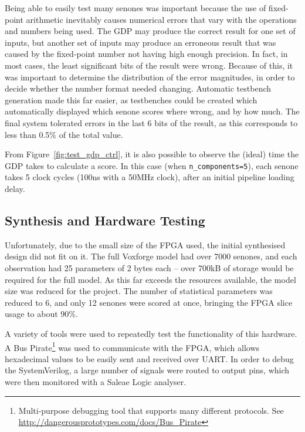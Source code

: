 	Being able to easily test many senones was important because the use of fixed-point arithmetic inevitably causes numerical errors that vary with the operations and numbers being used.  The GDP may produce the correct result for one set of inputs, but another set of inputs may produce an erroneous result that was caused by the fixed-point number not having high enough precision.  In fact, in most cases, the least significant bits of the result were wrong.  Because of this, it was important to determine the distribution of the error magnitudes, in order to decide whether the number format needed changing.  Automatic testbench generation made this far easier, as testbenches could be created which automatically displayed which senone scores where wrong, and by how much.  The final system tolerated errors in the last 6 bits of the result, as this corresponds to less than 0.5\% of the total value.


	From Figure~\ref{fig:test_gdp_ctrl}, it is also possible to observe the (ideal) time the GDP takes to calculate a score.  In this case (when \texttt{n\_components=5}), each senone takes 5 clock cycles (100ns with a 50MHz clock), after an initial pipeline loading delay.

	\subsection{Synthesis and Hardware Testing} %
	\label{sub:gdp_synthesis_and_hardware_testing}
		Unfortunately, due to the small size of the FPGA used, the initial synthesised design did not fit on it.  The full Voxforge model had over 7000 senones, and each observation had 25 parameters of 2 bytes each -- over 700kB of storage would be required for the full model.  As this far exceeds the resources available, the model size was reduced for the project.  The number of statistical parameters was reduced to 6, and only 12 senones were scored at once, bringing the FPGA slice usage to about 90\%.  %

		A variety of tools were used to repeatedly test the functionality of this hardware.  A Bus Pirate\footnote{Multi-purpose debugging tool that supports many different protocols.  See \href{http://dangerousprototypes.com/docs/Bus_Pirate}{http://dangerousprototypes.com/docs/Bus\_Pirate}} was used to communicate with the FPGA, which allows hexadecimal values to be easily sent and received over UART.  In order to debug the SystemVerilog, a large number of signals were routed to output pins, which were then monitored with a Saleae Logic analyser.



